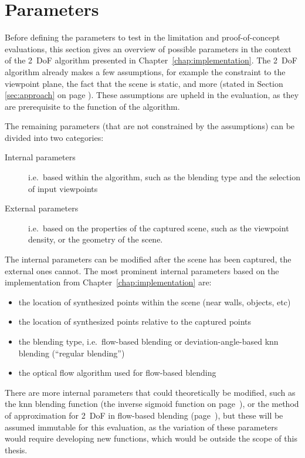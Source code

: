 \section{Parameters} \label{sec:params}
Before defining the parameters to test in the limitation and proof-of-concept evaluations, this section gives an overview of possible parameters in the context of the 2~DoF algorithm presented in Chapter~\ref{chap:implementation}.
The 2~DoF algorithm already makes a few assumptions, for example the constraint to the viewpoint plane, the fact that the scene is static, and more (stated in Section \ref{sec:approach} on page \pageref{sec:approach}). These assumptions are upheld in the evaluation, as they are prerequisite to the function of the algorithm.

The remaining parameters (that are not constrained by the assumptions) can be divided into two categories: 
\begin{description}
    \item [Internal parameters] i.e.\ based within the algorithm, such as the blending type and the selection of input viewpoints
    \item [External parameters] i.e.\ based on the properties of the captured scene, such as the viewpoint density, or the geometry of the scene.
\end{description}      

The internal parameters can be modified after the scene has been captured, the external ones cannot.  The most prominent internal parameters based on the implementation from Chapter~\ref{chap:implementation} are:

\begin{itemize}
  \item the location of synthesized points within the scene (near walls, objects, etc)
  \item the location of synthesized points relative to the captured points
  \item the blending type, i.e.\ flow-based blending or deviation-angle-based knn blending (``regular blending'')
  \item the optical flow algorithm used for flow-based blending
\end{itemize}

There are more internal parameters that could theoretically be modified, such as the knn blending function (the inverse sigmoid function on page~\pageref{eq:sigmoid}), or the method of approximation for 2~DoF in flow-based blending (page~\pageref{subsec:2dof_flow-based}), but these will be assumed immutable for this evaluation, as the variation of these parameters would require developing new functions, which would be outside the scope of this thesis.


